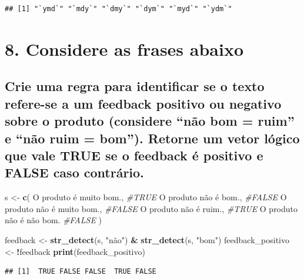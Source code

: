 \documentclass[
]{article}
\newenvironment{Shaded}{\begin{snugshade}}{\end{snugshade}}
\newcommand{\CommentTok}[1]{\textcolor[rgb]{0.56,0.35,0.01}{\textit{#1}}}
\newcommand{\FunctionTok}[1]{\textcolor[rgb]{0.13,0.29,0.53}{\textbf{#1}}}
\newcommand{\NormalTok}[1]{#1}
\newcommand{\OtherTok}[1]{\textcolor[rgb]{0.56,0.35,0.01}{#1}}
\newcommand{\SpecialCharTok}[1]{\textcolor[rgb]{0.81,0.36,0.00}{\textbf{#1}}}
\newcommand{\StringTok}[1]{\textcolor[rgb]{0.31,0.60,0.02}{#1}}
\begin{document}
\begin{verbatim}
## [1] "`ymd`" "`mdy`" "`dmy`" "`dym`" "`myd`" "`ydm`"
\end{verbatim}

\section{8. Considere as frases
abaixo}\label{considere-as-frases-abaixo}

\subsection{Crie uma regra para identificar se o texto refere-se a um
feedback positivo ou negativo sobre o produto (considere ``não bom =
ruim'' e ``não ruim = bom''). Retorne um vetor lógico que vale TRUE se o
feedback é positivo e FALSE caso
contrário.}\label{crie-uma-regra-para-identificar-se-o-texto-refere-se-a-um-feedback-positivo-ou-negativo-sobre-o-produto-considere-nuxe3o-bom-ruim-e-nuxe3o-ruim-bom.-retorne-um-vetor-luxf3gico-que-vale-true-se-o-feedback-uxe9-positivo-e-false-caso-contruxe1rio.}

\begin{Shaded}
\begin{Highlighting}[]
\NormalTok{s }\OtherTok{\textless{}{-}} \FunctionTok{c}\NormalTok{(}
  \StringTok{\textquotesingle{}O produto é muito bom.\textquotesingle{}}\NormalTok{, }\CommentTok{\#TRUE}
  \StringTok{\textquotesingle{}O produto não é bom.\textquotesingle{}}\NormalTok{, }\CommentTok{\#FALSE}
  \StringTok{\textquotesingle{}O produto não é muito bom.\textquotesingle{}}\NormalTok{, }\CommentTok{\#FALSE}
  \StringTok{\textquotesingle{}O produto não é ruim.\textquotesingle{}}\NormalTok{, }\CommentTok{\#TRUE}
  \StringTok{\textquotesingle{}O produto não é não bom.\textquotesingle{}} \CommentTok{\#FALSE}
\NormalTok{)}

\NormalTok{feedback }\OtherTok{\textless{}{-}} \FunctionTok{str\_detect}\NormalTok{(s, }\StringTok{"não"}\NormalTok{) }\SpecialCharTok{\&} \FunctionTok{str\_detect}\NormalTok{(s, }\StringTok{"bom"}\NormalTok{)}
\NormalTok{feedback\_positivo }\OtherTok{\textless{}{-}} \SpecialCharTok{!}\NormalTok{feedback}
\FunctionTok{print}\NormalTok{(feedback\_positivo)}
\end{Highlighting}
\end{Shaded}

\begin{verbatim}
## [1]  TRUE FALSE FALSE  TRUE FALSE
\end{verbatim}
\end{document}
